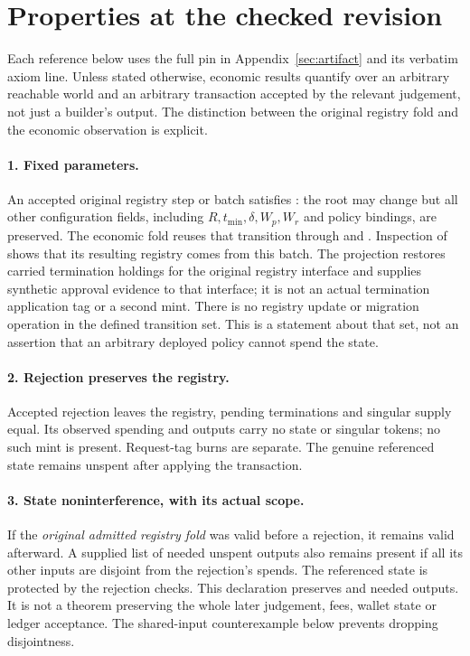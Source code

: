 \section{Properties at the checked revision}
\label{sec:properties}
Each reference below uses the full pin in Appendix~\ref{sec:artifact} and its
verbatim axiom line. Unless stated otherwise, economic results quantify over
an arbitrary reachable world and an arbitrary transaction accepted by the
relevant judgement, not just a builder's output. The distinction between the
original registry fold and the economic observation is explicit.

\paragraph{1. Fixed parameters.}
\checked An accepted original registry step or batch satisfies
: the root may change but all other configuration
fields, including $R,t_{\min},\delta,W_p,W_r$ and policy bindings, are preserved.
\hand The economic fold reuses that transition through
 and . Inspection of
 shows that its resulting registry comes from this
batch. The projection restores carried termination holdings for the original
registry interface and supplies synthetic approval evidence to that interface;
it is not an actual termination application tag or a second mint.
There is no registry update or migration operation in the defined transition
set. This is a statement about that set, not an assertion that an arbitrary
deployed policy cannot spend the state.

\paragraph{2. Rejection preserves the registry.}
\checked Accepted rejection leaves the registry, pending terminations and
singular supply equal. Its observed spending and outputs carry no state or
singular tokens; no such mint is present. Request-tag burns are separate.
The genuine referenced state remains unspent after applying the transaction.

\paragraph{3. State noninterference, with its actual scope.}
\checked If the \emph{original admitted registry fold} was valid before a
rejection, it remains valid afterward. A supplied list of needed unspent
outputs also remains present if all its other inputs are disjoint from the
rejection's spends. The referenced state is protected by the rejection checks.
\missing This declaration preserves  and
needed outputs. It is not a theorem preserving the whole later
 judgement, fees, wallet state or ledger acceptance.
The shared-input counterexample below prevents dropping disjointness.

